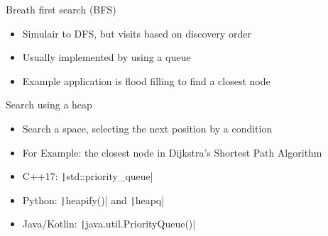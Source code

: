 \documentclass[11pt,pdf, aspectratio=169]{beamer}
\begin{document}
  \begin{frame}{Breath first search (BFS)}
    \begin{itemize}
      \item Simulair to DFS, but visits based on discovery order
      \item Usually implemented by using a queue
      \item Example application is flood filling to find a closest node
    \end{itemize}
  \end{frame}
  \begin{frame}{Search using a heap}
    \begin{itemize}
      \item Search a space, selecting the next position by a condition
      \item For Example: the closest node in Dijkstra's Shortest Path Algorithm
      \item C++17: \texttt|std::priority_queue|
      \item Python: \texttt|heapify()| and \texttt|heapq|
      \item Java/Kotlin: \texttt|java.util.PriorityQueue()|
    \end{itemize}
  \end{frame}
\end{document}
